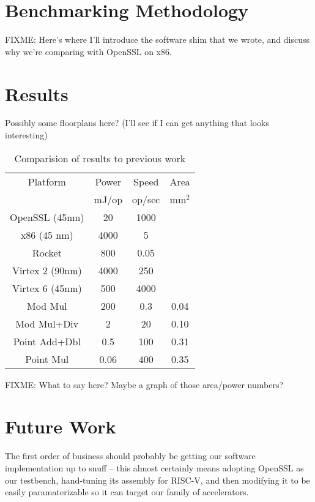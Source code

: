 \documentclass[twocolumn]{article}
\begin{document}
\section{Benchmarking Methodology}

FIXME: Here's where I'll introduce the software shim that we wrote,
and discuss why we're comparing with OpenSSL on x86.

\section{Results}

Possibly some floorplans here?
(I'll see if I can get anything that looks interesting)

\begin{table}[ht]
  \begin{center}
    \begin{tabular}{c|ccc}
      Platform        & Power & Speed  & Area \\
                      & mJ/op & op/sec & mm$^2$ \\
      \hline
      OpenSSL (45nm)  & 20    & 1000   &      \\
      x86 (45 nm)     & 4000  & 5      &      \\
      Rocket          & 800   & 0.05   &      \\
      Virtex 2 (90nm) & 4000  & 250    &      \\
      Virtex 6 (45nm) & 500   & 4000   &      \\
      \hline
      Mod Mul         & 200   & 0.3    & 0.04 \\
      Mod Mul+Div     & 2     & 20     & 0.10 \\
      Point Add+Dbl   & 0.5   & 100    & 0.31 \\
      Point Mul       & 0.06  & 400    & 0.35 \\
    \end{tabular}
  \end{center}

  \caption{Comparision of results to previous work
    \label{results}}
\end{table}

FIXME: What to say here?  Maybe a graph of those area/power numbers?

\section{Future Work}

The first order of business should probably be getting our software
implementation up to snuff -- this almost certainly means adopting
OpenSSL as our testbench, hand-tuning its assembly for RISC-V, and
then modifying it to be easily paramaterizable so it can target our
family of accelerators.
\end{document}

